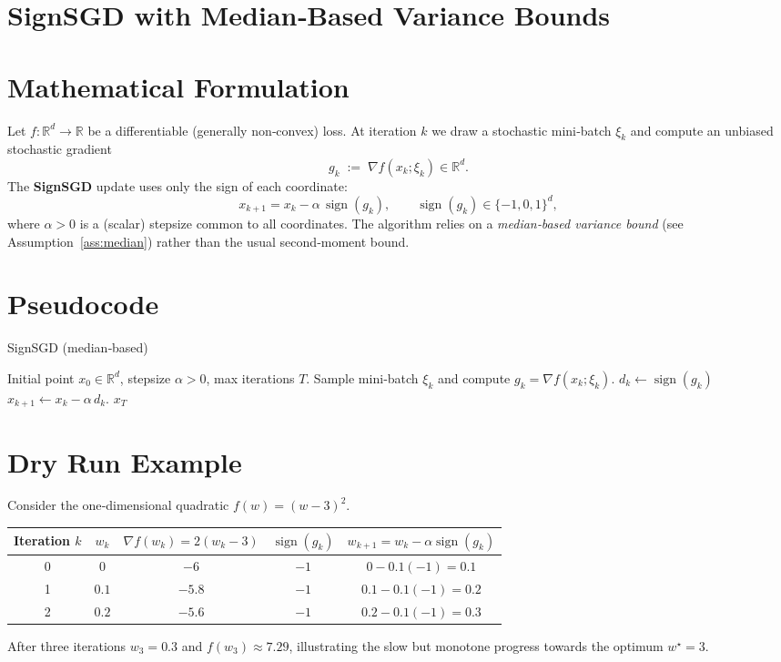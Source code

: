 \documentclass[11pt]{article}
\newcommand{\sign}{\operatorname{sign}}
\newcommand{\RR}{\mathbb{R}}
\begin{document}
\section*{SignSGD with Median‑Based Variance Bounds}

\section*{Mathematical Formulation}
Let $f:\RR^{d}\to\RR$ be a differentiable (generally non‑convex) loss.  
At iteration $k$ we draw a stochastic mini‑batch $\xi_{k}$ and compute an unbiased stochastic gradient
\[
g_{k}\;:=\;\nabla f(x_{k};\xi_{k})\in\RR^{d}.
\]
The \textbf{SignSGD} update uses only the sign of each coordinate:
\begin{equation}
\label{eq:update}
x_{k+1}=x_{k}-\alpha\,\sign(g_{k}),\qquad 
\sign(g_{k})\in\{-1,0,1\}^{d},
\end{equation}
where $\alpha>0$ is a (scalar) stepsize common to all coordinates.  
The algorithm relies on a \emph{median‑based variance bound} (see Assumption~\ref{ass:median}) rather than the usual second‑moment bound.

\section*{Pseudocode}
\begin{algorithm}[H]
\caption{SignSGD (median‑based)}
\begin{algorithmic}[1]
\Require Initial point $x_{0}\in\RR^{d}$, stepsize $\alpha>0$, max iterations $T$.
    \State Sample mini‑batch $\xi_{k}$ and compute $g_{k}=\nabla f(x_{k};\xi_{k})$.
    \State $d_{k}\gets \sign(g_{k})$   
    \State $x_{k+1}\gets x_{k}-\alpha\,d_{k}$.
\EndFor
\State \Return $x_{T}$
\end{algorithmic}
\end{algorithm}

\section*{Dry Run Example}
Consider the one‑dimensional quadratic $f(w)=(w-3)^{2}$.
\begin{center}
\begin{tabular}{c c c c c}
\toprule
Iteration $k$ & $w_{k}$ & $\nabla f(w_{k})=2(w_{k}-3)$ & $\sign(g_{k})$ & $w_{k+1}=w_{k}-\alpha\sign(g_{k})$\\
\midrule
0 & $0$ & $-6$ & $-1$ & $0-0.1(-1)=0.1$ \\
1 & $0.1$ & $-5.8$ & $-1$ & $0.1-0.1(-1)=0.2$ \\
2 & $0.2$ & $-5.6$ & $-1$ & $0.2-0.1(-1)=0.3$ \\
\bottomrule
\end{tabular}
\end{center}
After three iterations $w_{3}=0.3$ and $f(w_{3})\approx7.29$, illustrating the slow but monotone progress towards the optimum $w^{\star}=3$.
\end{document}
